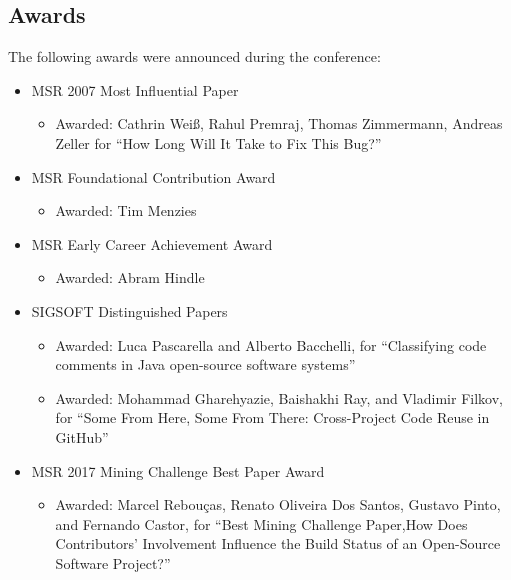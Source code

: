 \documentclass[a4paper]{report}
\begin{document}
\subsection{Awards}

The following awards were announced during the conference:

\begin{itemize}
\item MSR 2007 Most Influential Paper
 \begin{itemize}
   \item[] Awarded: Cathrin Weiß, Rahul Premraj, Thomas Zimmermann, Andreas
Zeller for ``How Long Will It Take to Fix This Bug?''
 \end{itemize}

\item MSR Foundational Contribution Award
  \begin{itemize}
  \item[] Awarded: Tim Menzies
  \end{itemize}
  
\item  MSR Early Career Achievement Award 
  \begin{itemize}
  \item[] Awarded: Abram Hindle
  \end{itemize}


\item SIGSOFT Distinguished Papers

  \begin{itemize}
  \item[] Awarded: Luca Pascarella and Alberto Bacchelli, for ``Classifying code comments in Java open-source software systems''
  \item[] Awarded: Mohammad Gharehyazie, Baishakhi Ray, and Vladimir Filkov, for ``Some From Here, Some From There: Cross-Project Code Reuse in GitHub''
  \end{itemize}


\item MSR 2017 Mining Challenge Best Paper Award
 
  \begin{itemize}
    \item[] Awarded: Marcel Rebouças, Renato Oliveira Dos Santos, Gustavo Pinto, and Fernando Castor, for ``Best Mining Challenge Paper,How Does Contributors’ Involvement Influence the Build Status of an Open-Source Software Project?''
  \end{itemize}


\end{itemize}
\end{document}
